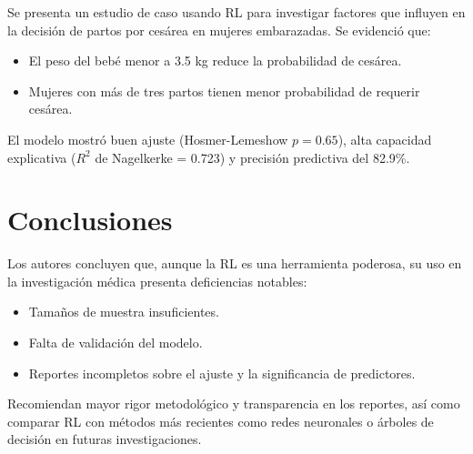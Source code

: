 \documentclass[12pt]{article}
\begin{document}
Se presenta un estudio de caso usando RL para investigar factores que influyen en la decisi\'on de partos por ces\'area en mujeres embarazadas. Se evidenci\'o que:
\begin{itemize}
  \item El peso del beb\'e menor a 3.5 kg reduce la probabilidad de ces\'area.
  \item Mujeres con m\'as de tres partos tienen menor probabilidad de requerir ces\'area.
\end{itemize}

El modelo mostr\'o buen ajuste (Hosmer-Lemeshow $p = 0.65$), alta capacidad explicativa ($R^2$ de Nagelkerke = 0.723) y precisi\'on predictiva del 82.9\%.

\section*{Conclusiones}

Los autores concluyen que, aunque la RL es una herramienta poderosa, su uso en la investigaci\'on m\'edica presenta deficiencias notables:
\begin{itemize}
  \item Tama\~nos de muestra insuficientes.
  \item Falta de validaci\'on del modelo.
  \item Reportes incompletos sobre el ajuste y la significancia de predictores.
\end{itemize}

Recomiendan mayor rigor metodol\'ogico y transparencia en los reportes, as\'i como comparar RL con m\'etodos m\'as recientes como redes neuronales o \'arboles de decisi\'on en futuras investigaciones.
\end{document}
